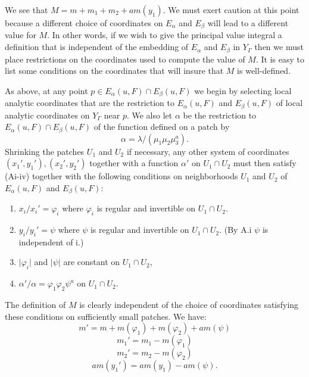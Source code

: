 \documentclass{memo-l}
\theoremstyle{definition}
\theoremstyle{remark}
\numberwithin{section}{chapter}
\numberwithin{equation}{chapter}
\begin{document}
\medskip
   We see that $M  =  m+m_{1}+m_{2}+am(y_{1})$.  We must exert caution at
this point because a different choice of coordinates on $E_{{\alpha}}$ and
$E_{{\beta}}$ will lead to a different value for $M$.  In other words, if
we wish to give the principal value integral a definition that is
independent of the embedding of $E_{{\alpha}}$ and $E_{{\beta}}$ in
$Y_{{\Gamma}}$ then we must place restrictions on the coordinates used to
compute the value of $M$.  It is easy to list some conditions on the
coordinates that will insure that $M$ is well-defined.


   As above, at any point $p \in E_{{\alpha}}(u,F) \cap
E_{{\beta}}(u,F)$ we begin by selecting local analytic coordinates that are
the restriction to $E_{{\alpha}}(u,F)$ and $E_{{\beta}}(u,F)$ of local
analytic coordinates on $Y_{{\Gamma}}$ near $p$.  We also let ${\alpha}$ be
the restriction to $E_{{\alpha}}(u,F) \cap E_{{\beta}}(u,F)$ of the
function defined on a patch by
$$
{\alpha}  =  {\lambda}/({\mu}_{1}{\mu}_{2}{\mu}_{3}^{a}) .
$$
Shrinking the patches $U_{1}$ and $U_{2}$ if necessary, any other system of
coordinates $(x_{1}',y_{1}'), (x_{2}',y_{2}')$ together with a function
${\alpha}'$ on $U_{1} \cap U_{2}$ must then satisfy (Ai-iv) together with
the following conditions on neighborhoods $U_{1}$ and $U_{2}$ of
$E_{{\alpha}}(u,F)$ and $E_{{\beta}}(u,F) :$

\begin{enumerate}[label=B.\roman*)]
\item
$x_{i}/x_{i}'  =  {\varphi}_{i}$ where ${\varphi}_{i}$ is regular and
invertible on $U_{1} \cap U_{2}$.

\item
$y_{i}/y_{i}'  =  \psi$ where $\psi$ is
regular and invertible on $U_{1} \cap U_{2}$.  (By A.i $\psi$
is independent of i.)

\item
$\vert\varphi_{i}\vert$ and $\vert \psi \vert$ are
constant on $U_{1} \cap U_{2}$,

\item
${\alpha}'/{\alpha}  =  {\varphi}_{1}{\varphi}_{2}{\psi}^{a}$ on
$U_{1} \cap U_{2}$.
\end{enumerate}


\noindent
The definition of $M$ is clearly independent of the choice of coordinates
satisfying these conditions on sufficiently small patches.  We have:
$$
m'  =  m + m({\varphi}_{1}) + m({\varphi}_{2}) + am(\psi)
$$
$$
m_{1}'  =  m_{1} - m({\varphi}_{1})
$$
$$
m_{2}'  =  m_{2} - m({\varphi}_{2})
$$
$$
am(y_{1}')  =  am(y_{1}) - am(\psi).
$$
\end{document}
